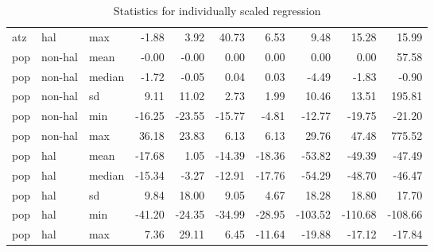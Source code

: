 \begin{table}[ht]
\begin{tabular}{lllrrrrrrr}
  atz & hal & max & -1.88 & 3.92 & 40.73 & 6.53 & 9.48 & 15.28 & 15.99 \\ 
  pop & non-hal & mean & -0.00 & -0.00 & 0.00 & 0.00 & 0.00 & 0.00 & 57.58 \\ 
  pop & non-hal & median & -1.72 & -0.05 & 0.04 & 0.03 & -4.49 & -1.83 & -0.90 \\ 
  pop & non-hal & sd & 9.11 & 11.02 & 2.73 & 1.99 & 10.46 & 13.51 & 195.81 \\ 
  pop & non-hal & min & -16.25 & -23.55 & -15.77 & -4.81 & -12.77 & -19.75 & -21.20 \\ 
  pop & non-hal & max & 36.18 & 23.83 & 6.13 & 6.13 & 29.76 & 47.48 & 775.52 \\ 
  pop & hal & mean & -17.68 & 1.05 & -14.39 & -18.36 & -53.82 & -49.39 & -47.49 \\ 
  pop & hal & median & -15.34 & -3.27 & -12.91 & -17.76 & -54.29 & -48.70 & -46.47 \\ 
  pop & hal & sd & 9.84 & 18.00 & 9.05 & 4.67 & 18.28 & 18.80 & 17.70 \\ 
  pop & hal & min & -41.20 & -24.35 & -34.99 & -28.95 & -103.52 & -110.68 & -108.66 \\ 
  pop & hal & max & 7.36 & 29.11 & 6.45 & -11.64 & -19.88 & -17.12 & -17.84 \\ 
   \hline
\end{tabular}
\caption{Statistics for individually scaled regression \label{tab:indi_scaled} }
\end{table}

